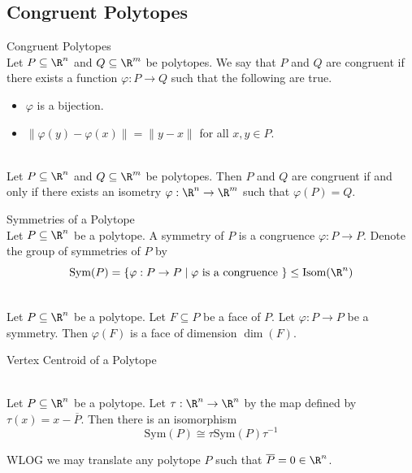 \documentclass[a4paper]{article}
\begin{document}
\subsection{Congruent Polytopes}
\begin{defn}{Congruent Polytopes}{}\\
Let $P\subseteq\R^n$ and $Q\subseteq\R^m$ be polytopes. We say that $P$ and $Q$ are congruent if there exists a function $\varphi:P\to Q$ such that the following are true. 
\begin{itemize}
\item $\varphi$ is a bijection. 
\item $\|\varphi(y)-\varphi(x)\|=\|y-x\|$ for all $x,y\in P$. 
\end{itemize}
\end{defn}

\begin{prp}{}{}\\
Let $P\subseteq\R^n$ and $Q\subseteq\R^m$ be polytopes. Then $P$ and $Q$ are congruent if and only if there exists an isometry $\varphi:\R^n\to\R^m$ such that $\varphi(P)=Q$. 
\end{prp}

\begin{defn}{Symmetries of a Polytope}{}\\
Let $P\subseteq\R^n$ be a polytope. A symmetry of $P$ is a congruence $\varphi:P\to P$. Denote the group of symmetries of $P$ by $$\text{Sym}(P)=\{\varphi:P\to P\;|\;\varphi\text{ is a congruence }\}\leq\text{Isom}(\R^n)$$
\end{defn}

\begin{lmm}{}{}\\
Let $P\subseteq\R^n$ be a polytope. Let $F\subseteq P$ be a face of $P$. Let $\varphi:P\to P$ be a symmetry. Then $\varphi(F)$ is a face of dimension $\dim(F)$. 
\end{lmm}

\begin{defn}{Vertex Centroid of a Polytope}{}
\end{defn}

\begin{prp}{}{}\\
Let $P\subseteq\R^n$ be a polytope. Let $\tau:\R^n\to\R^n$ by the map defined by $\tau(x)=x-\overline{P}$. Then there is an isomorphism $$\text{Sym}(P)\cong\tau\text{Sym}(P)\tau^{-1}$$
\end{prp}

WLOG we may translate any polytope $P$ such that $\overline{P}=0\in\R^n$. 
\end{document}
